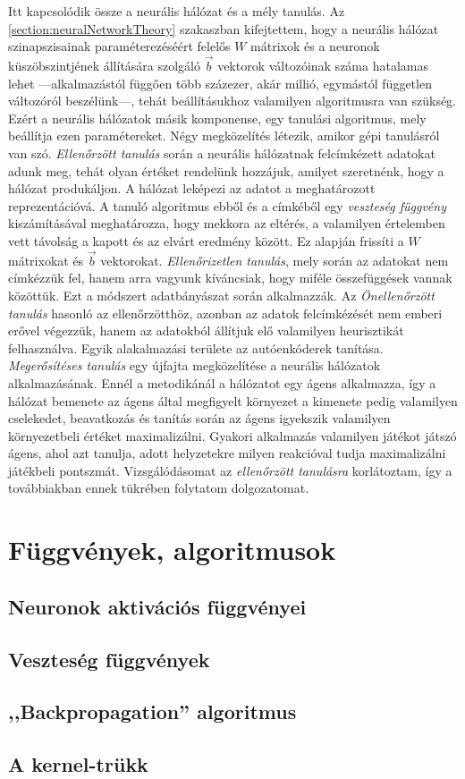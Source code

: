 Itt kapcsolódik össze a neurális hálózat és a mély tanulás. Az \ref{section:neuralNetworkTheory} szakaszban kifejtettem, hogy a neurális hálózat szinapszisainak paraméterezéséért felelős $W$ mátrixok és a neuronok küszöbszintjének állítására szolgáló $\vec{b}$ vektorok változóinak száma hatalamas lehet ---alkalmazástól függően több százezer, akár millió, egymástól független változóról beszélünk---, tehát beállításukhoz valamilyen algoritmusra van szükség.
Ezért a neurális hálózatok másik komponense, egy tanulási algoritmus, mely beállítja ezen paramétereket. Négy  megközelítés létezik, amikor gépi tanulásról van szó.
\emph{Ellenőrzött tanulás} során a neurális hálózatnak felcímkézett adatokat adunk meg, tehát olyan értéket rendelünk hozzájuk, amilyet szeretnénk, hogy a hálózat produkáljon. A hálózat leképezi az adatot a meghatározott reprezentációvá. A tanuló algoritmus ebből és a címkéből egy \emph{veszteség függvény} kiszámításával meghatározza, hogy mekkora az eltérés, a valamilyen értelemben vett távolság a kapott és az elvárt eredmény között. Ez alapján frissíti a $W$ mátrixokat és $\vec{b}$ vektorokat.
\emph{Ellenőrizetlen tanulás}, mely során az adatokat nem címkézzük fel, hanem arra vagyunk kíváncsiak, hogy miféle összefüggések vannak közöttük. Ezt a módszert adatbányászat során alkalmazzák. 
Az \emph{Önellenőrzött tanulás} hasonló az ellenőrzötthöz, azonban az adatok felcímkézését nem emberi erővel végezzük, hanem az adatokból állítjuk elő valamilyen heurisztikát felhasználva. Egyik alakalmazási területe az autóenkóderek tanítása.
\emph{Megerősítéses tanulás} egy újfajta megközelítése a neurális hálózatok alkalmazásának. Ennél a metodikánál a hálózatot egy ágens alkalmazza, így a hálózat bemenete az ágens által megfigyelt környezet a kimenete pedig valamilyen cselekedet, beavatkozás és tanítás során az ágens igyekszik valamilyen környezetbeli értéket maximalizálni. Gyakori alkalmazás valamilyen játékot játszó ágens, ahol azt tanulja, adott helyzetekre milyen reakcióval tudja maximalizálni játékbeli pontszmát.
Vizsgálódásomat az \emph{ellenőrzött tanulásra} korlátoztam, így a továbbiakban ennek tükrében folytatom dolgozatomat.

\section{Függvények, algoritmusok}

\subsection{Neuronok aktivációs függvényei}

\subsection{Veszteség függvények}

\subsection{,,Backpropagation'' algoritmus}

\subsection{A kernel-trükk}
